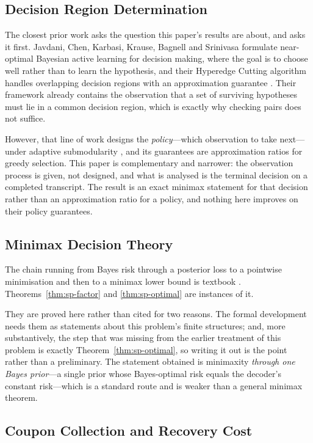 \documentclass[conference]{IEEEtran}
\theoremstyle{definition}
\begin{document}
\subsection{Decision Region Determination}

The closest prior work asks the question this paper's results are about, and asks it first.
Javdani, Chen,
Karbasi, Krause, Bagnell and Srinivasa formulate near-optimal Bayesian active learning for
decision making, where the goal is to choose well rather than to learn the hypothesis, and
their Hyperedge Cutting algorithm handles overlapping decision regions with an approximation
guarantee \cite{javdani2014}. Their framework already contains the observation that a set of
surviving hypotheses must lie in a common decision region, which is exactly why checking pairs
does not suffice.

However, that line of work designs the \emph{policy}---which observation to take next---under
adaptive submodularity \cite{golovin2011}, and its guarantees are approximation ratios for
greedy selection. This paper is complementary and narrower: the observation process is given,
not designed, and what is analysed is the terminal decision on a completed transcript. The
result is an exact minimax statement for that decision rather than an approximation ratio for
a policy, and nothing here improves on their policy guarantees.

\subsection{Minimax Decision Theory}

The chain running from Bayes risk through a posterior loss to a pointwise minimisation and
then to a minimax lower bound is textbook \cite{lehmann1998,wald1950}.
Theorems~\ref{thm:sp-factor} and \ref{thm:sp-optimal} are instances of it.

They are proved here rather than cited for two reasons. The formal development needs them as
statements about this problem's finite structures; and, more substantively, the step that was
missing from the earlier treatment of this problem is exactly
Theorem~\ref{thm:sp-optimal}, so writing it out is the point rather than a preliminary. The
statement obtained is minimaxity \emph{through one Bayes prior}---a single prior whose
Bayes-optimal risk equals the decoder's constant risk---which is a standard route and is
weaker than a general minimax theorem.

\subsection{Coupon Collection and Recovery Cost}
\end{document}
